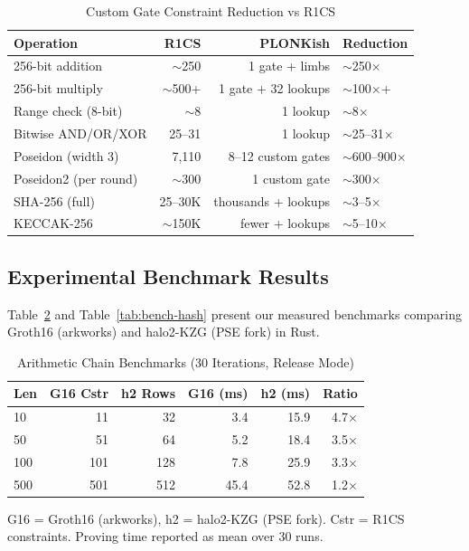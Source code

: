 \begin{table}[htbp]
\caption{Custom Gate Constraint Reduction vs R1CS}
\label{tab:custom-gates}
\centering
\begin{tabular}{@{}lrrl@{}}
\toprule
\textbf{Operation} & \textbf{R1CS} & \textbf{PLONKish} & \textbf{Reduction} \\
\midrule
256-bit addition & $\sim$250 & 1 gate + limbs & $\sim$250$\times$ \\
256-bit multiply & $\sim$500+ & 1 gate + 32 lookups & $\sim$100$\times$+ \\
Range check (8-bit) & $\sim$8 & 1 lookup & $\sim$8$\times$ \\
Bitwise AND/OR/XOR & 25--31 & 1 lookup & $\sim$25--31$\times$ \\
Poseidon (width 3) & 7,110 & 8--12 custom gates & $\sim$600--900$\times$ \\
Poseidon2 (per round) & $\sim$300 & 1 custom gate & $\sim$300$\times$ \\
SHA-256 (full) & 25--30K & thousands + lookups & $\sim$3--5$\times$ \\
KECCAK-256 & $\sim$150K & fewer + lookups & $\sim$5--10$\times$ \\
\bottomrule
\end{tabular}
\end{table}

\subsection{Experimental Benchmark Results}

Table~\ref{tab:bench-arith} and Table~\ref{tab:bench-hash} present
our measured benchmarks comparing Groth16 (arkworks) and halo2-KZG
(PSE fork) in Rust.

\begin{table}[htbp]
\caption{Arithmetic Chain Benchmarks (30 Iterations, Release Mode)}
\label{tab:bench-arith}
\centering
\begin{tabular}{@{}lrrrrr@{}}
\toprule
\textbf{Len} & \textbf{G16 Cstr} & \textbf{h2 Rows} & \textbf{G16 (ms)} & \textbf{h2 (ms)} & \textbf{Ratio} \\
\midrule
10  & 11  & 32  & 3.4  & 15.9 & 4.7$\times$ \\
50  & 51  & 64  & 5.2  & 18.4 & 3.5$\times$ \\
100 & 101 & 128 & 7.8  & 25.9 & 3.3$\times$ \\
500 & 501 & 512 & 45.4 & 52.8 & 1.2$\times$ \\
\bottomrule
\end{tabular}
\begin{flushleft}
\footnotesize G16 = Groth16 (arkworks), h2 = halo2-KZG (PSE fork).
Cstr = R1CS constraints. Proving time reported as mean over 30 runs.
\end{flushleft}
\end{table}

